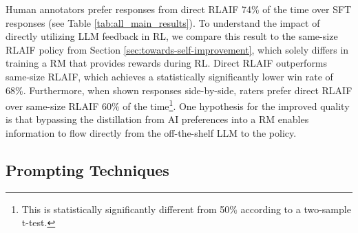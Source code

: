 \documentclass[11pt]{article}
\begin{document}
Human annotators prefer responses from direct RLAIF 74\% of the time over SFT responses (see Table \ref{tab:all_main_results}). To understand the impact of directly utilizing LLM feedback in RL, we compare this result to the same-size RLAIF policy from Section \ref{sec:towards-self-improvement}, which solely differs in training a RM that provides rewards during RL. Direct RLAIF outperforms same-size RLAIF, which achieves a statistically significantly lower win rate of 68\%. Furthermore, when shown responses side-by-side, raters prefer direct RLAIF over same-size RLAIF 60\% of the time\footnote{This is statistically significantly different from 50\% according to a two-sample t-test.}. One hypothesis for the improved quality is that bypassing the distillation from AI preferences into a RM enables information to flow directly from the off-the-shelf LLM  to the policy.

\subsection{Prompting Techniques}
\label{sec:prompting_techniques}

\begin{table}[ht]
\centering 
\setlength{\tabcolsep}{1pt}
\caption{We observe that eliciting chain-of-thought reasoning tends to improve AI labeler alignment, while few-shot prompting and detailed preambles have mixed effects across tasks. H1 refers to helpfulness, H2 to harmlessness.}
\label{table:prompting_techniques}
\end{table}
\end{document}
